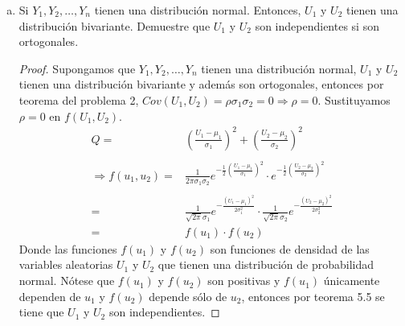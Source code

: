 \documentclass[a4paper,12pt]{article}
\begin{document}
\begin{enumerate}[a)]
\begin{proof}
            Sabemos que $Cov(Yi,Y_i) = E(Y_iY_i)-E(Y_i)E(Y_i) = E(Y_i^2)-\mu\mu = E(Y_i^2)-\mu^2 = V(Y_i)\Rightarrow Cov(Yi,Y_i) = V(Y_i) = \sigma^2$. Además hemos probado que $ Cov(U_1,U_2) = \sum_{i=1}^n a_ib_i Cov(Y_i,Y_i) = \sum_{i=1}^n a_ib_i\sigma^2 = \sigma^2\sum_{i=1}^n a_ib_i$ y si $Cov(U_1,U_2) = 0 \Leftrightarrow \sigma^2\sum_{i=1}^n a_ib_i = 0$. Siempre que $\sigma^2$ sea estrictamente mayor a cero $\sigma^2 > 0 \Leftrightarrow \sum_{i=1}^n a_ib_i = 0$, se espera que $\sigma^2 > 0$ en la mayor parte de los casos. 
            \begin{center}
                $\therefore Cov(U_1,U_2)$ son ortogonales sí y sólo si $\sum_{i=1}^n a_ib_i = 0$ tal que $\sigma^2 > 0$
            \end{center}
        \end{proof}
    
    \item Si $Y_1, Y_2, \dots, Y_n$ tienen una distribución normal. Entonces, $U_1$ y $U_2$ tienen una distribución bivariante. Demuestre que $U_1$ y $U_2$ son independientes si son ortogonales.
    \begin{proof}
        Supongamos que $Y_1, Y_2, \dots, Y_n$ tienen una distribución normal, $U_1$ y $U_2$ tienen una distribución bivariante y además son ortogonales, entonces por teorema del problema 2, $Cov(U_1,U_2) =\rho\sigma_1\sigma_2 = 0 \Rightarrow \rho = 0$. Sustituyamos $\rho = 0$ en $f(U_1,U_2)$.
        \[
        \begin{array}{rl}
             Q = & \displaystyle\left(\frac{U_1-\mu_1}{\sigma_1}\right)^2 + \left(\frac{U_2-\mu_2}{\sigma_2}\right)^2  \\\\
             \Rightarrow f(u_1,u_2) = & \displaystyle \frac{1}{2\pi\sigma_1\sigma_2}e^{\displaystyle -\frac{1}{2}\left(\frac{U_1-\mu_1}{\sigma_1}\right)^2}\cdot e^{\displaystyle -\frac{1}{2}\left(\frac{U_2-\mu_2}{\sigma_2}\right)^2} \\\\
             = & \displaystyle \frac{1}{\sqrt{2\pi}\sigma_1} e^{\displaystyle -\frac{(U_1-\mu_1)^2}{2\sigma_1^2}}\cdot \frac{1}{\sqrt{2\pi}\sigma_2}e^{\displaystyle -\frac{(U_2-\mu_2)^2}{2\sigma_2^2}}\\
             = & f(u_1) \cdot f(u_2)
        \end{array}
        \]
        Donde las funciones $f(u_1)$ y $f(u_2)$ son funciones de densidad de las variables aleatorias $U_1$ y $U_2$ que tienen una distribución de probabilidad normal. Nótese que $f(u_1)$ y $f(u_2)$ son positivas y $f(u_1)$ únicamente dependen de $u_1$ y $f(u_2)$ depende sólo de $u_2$, entonces por teorema 5.5 se tiene que $U_1$ y $U_2$ son independientes. 
    \end{proof}
    

\end{enumerate}
\end{document}
